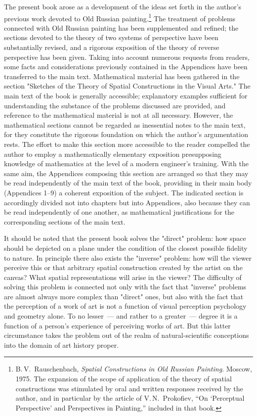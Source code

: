 
The present book arose as a development of the ideas set forth in the author's previous
work devoted to Old Russian painting.\footnote{%
  B.\,V.~Rauschenbach, \textit{Spatial Constructions in Old Russian Painting}. Moscow,
  1975. The expansion of the scope of application of the theory of spatial constructions
  was stimulated by oral and written responses received by the author, and in particular
  by the article of V.\,N.~Prokofiev, ``On `Perceptual Perspective' and Perspectives in
  Painting,'' included in that book.}
The treatment of problems connected with Old Russian painting has been supplemented
and refined; the sections devoted to the theory of two systems of perspective have been
substantially revised, and a rigorous exposition of the theory of reverse perspective has
been given. Taking into account numerous requests from readers, some facts and
considerations previously contained in the Appendices have been transferred to the main
text. Mathematical material has been gathered in the section "Sketches of the Theory of
Spatial Constructions in the Visual Arts." The main text of the book is generally
accessible; explanatory examples sufficient for understanding the substance of the
problems discussed are provided, and reference to the mathematical material is not at all
necessary. However, the mathematical sections cannot be regarded as inessential notes to
the main text, for they constitute the rigorous foundation on which the author's
argumentation rests. The effort to make this section more accessible to the reader
compelled the author to employ a mathematically elementary exposition presupposing
knowledge of mathematics at the level of a modern engineer's training. With the same
aim, the Appendices composing this section are arranged so that they may be read
independently of the main text of the book, providing in their main body (Appendices
1--9) a coherent exposition of the subject. The indicated section is accordingly divided
not into chapters but into Appendices, also because they can be read independently of
one another, as mathematical justifications for the corresponding sections of the main
text.

It should be noted that the present book solves the "direct" problem: how space should
be depicted on a plane under the condition of the closest possible fidelity to nature. In
principle there also exists the "inverse" problem: how will the viewer perceive this or
that arbitrary spatial construction created by the artist on the canvas? What spatial
representations will arise in the viewer? The difficulty of solving this problem is
connected not only with the fact that "inverse" problems are almost always more complex
than "direct" ones, but also with the fact that the perception of a work of art is not a
function of visual perception psychology and geometry alone. To no lesser~--- and rather
to a greater~--- degree it is a function of a person's experience of perceiving works of
art. But this latter circumstance takes the problem out of the realm of natural-scientific
conceptions into the domain of art history proper.


